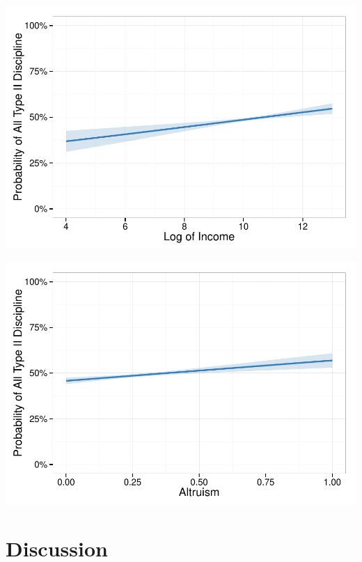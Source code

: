 \documentclass[]{elsarticle}
\begin{document}
\includegraphics{./qualpaper_v4_files/figure-latex/ModelResultGph1.pdf}

\includegraphics{./qualpaper_v4_files/figure-latex/ModelResultGph2.pdf}

\section{Discussion}\label{discussion}
\end{document}
